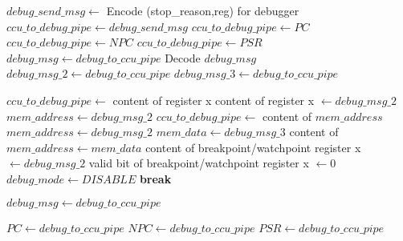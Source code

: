 \documentclass[a4paper, 11pt]{article}
\begin{document}
\begin{algorithm}
	\begin{algorithmic}
		\State $debug\_send\_msg \gets $ Encode (stop\_reason,reg) for debugger
		\State $ccu\_to\_debug\_pipe \gets debug\_send\_msg$
			\State $ccu\_to\_debug\_pipe \gets PC$	
			\State $ccu\_to\_debug\_pipe \gets NPC$
			\State $ccu\_to\_debug\_pipe \gets PSR$		
		\EndIf
		\State $debug\_msg \gets debug\_to\_ccu\_pipe$
		\State Decode $debug\_msg$
		\State $debug\_msg\_2 \gets debug\_to\_ccu\_pipe$
		\EndIf
		\State $debug\_msg\_3 \gets debug\_to\_ccu\_pipe$
		\EndIf
		
		
			\State $ccu\_to\_debug\_pipe \gets $ content of register x
			\State content of register x $\gets debug\_msg\_2$
			\State $mem\_address \gets debug\_msg\_2$
			\State $ccu\_to\_debug\_pipe \gets $ content of $mem\_address$
			\State $mem\_address \gets debug\_msg\_2$
			\State $mem\_data \gets debug\_msg\_3$
			\State content of $mem\_address \gets mem\_data$
			\State content of breakpoint/watchpoint register x $\gets debug\_msg\_2$
			\State valid bit of breakpoint/watchpoint register x $\gets 0$
			\State $debug\_mode \gets DISABLE$
			\State \textbf{break}
		\EndIf
		
		\State $debug\_msg \gets debug\_to\_ccu\_pipe$	
		\EndWhile
		
		\State $PC \gets debug\_to\_ccu\_pipe$
		\State $NPC \gets debug\_to\_ccu\_pipe$
		\State $PSR \gets debug\_to\_ccu\_pipe$
		\EndIf
			
		\EndFunction
	\end{algorithmic}
\end{algorithm}

\newpage
\end{document}
